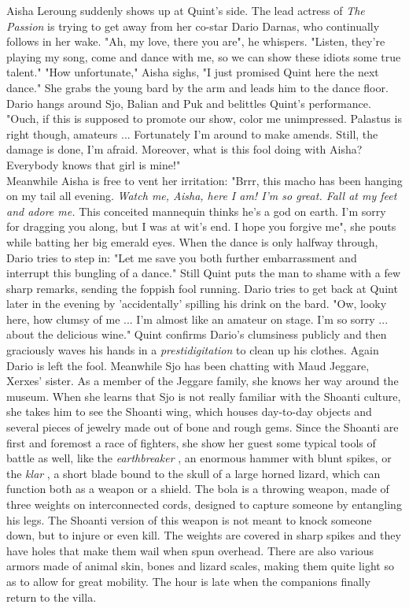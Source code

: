 Aisha Leroung suddenly shows up at Quint's side. The lead actress of {\itshape The Passion} is trying to get away from her co-star Dario Darnas, who continually follows in her wake. "Ah, my love, there you are", he whispers. "Listen, they're playing my song, come and dance with me, so we can show these idiots some true talent." "How unfortunate," Aisha sighs, "I just promised Quint here the next dance." She grabs the young bard by the arm and leads him to the dance floor. Dario hangs around Sjo, Balian and Puk and belittles Quint's performance. "Ouch, if this is supposed to promote our show, color me unimpressed. Palastus is right though, amateurs ... Fortunately I'm around to make amends. Still, the damage is done, I'm afraid. Moreover, what is this fool doing with Aisha? Everybody knows that girl is mine!"\\

Meanwhile Aisha is free to vent her irritation: "Brrr, this macho has been hanging on my tail all evening. {\itshape Watch me, Aisha, here I am! I'm so great. Fall at my feet and adore me.} This conceited mannequin thinks he's a god on earth. I'm sorry for dragging you along, but I was at wit's end. I hope you forgive me", she pouts while batting her big emerald eyes. When the dance is only halfway through, Dario tries to step in: "Let me save you both further embarrassment and interrupt this bungling of a dance." Still Quint puts the man to shame with a few sharp remarks, sending the foppish fool running. Dario tries to get back at Quint later in the evening by 'accidentally' spilling his drink on the bard. "Ow, looky here, how clumsy of me ... I'm almost like an amateur on stage. I'm so sorry ... about the delicious wine." Quint confirms Dario's clumsiness publicly and then graciously waves his hands in a {\itshape prestidigitation} to clean up his clothes. Again Dario is left the fool. Meanwhile Sjo has been chatting with Maud Jeggare, Xerxes' sister. As a member of the Jeggare family, she knows her way around the museum. When she learns that Sjo is not really familiar with the Shoanti culture, she takes him to see the Shoanti wing, which houses day-to-day objects and several pieces of jewelry made out of bone and rough gems. Since the Shoanti are first and foremost a race of fighters, she show her guest some typical tools of battle as well, like the {\itshape earthbreaker} , an enormous hammer with blunt spikes, or the  {\itshape klar} , a short blade bound to the skull of a large horned lizard, which can function both as a weapon or a shield. The bola is a throwing weapon, made of three weights on interconnected cords, designed to capture someone by entangling his legs. The Shoanti version of this weapon is not meant to knock someone down, but to injure or even kill. The weights are covered in sharp spikes and they have holes that make them wail when spun overhead. There are also various armors made of animal skin, bones and lizard scales, making them quite light so as to allow for great mobility. The hour is late when the companions finally return to the villa.\\

